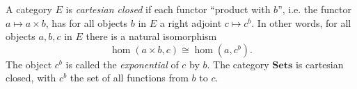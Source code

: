 A category $E$ is \emph{cartesian closed} if each functor ``product with $b$'', i.e. the functor $a \mapsto a \times b$, has for all objects $b$ in $E$ a right adjoint $c \mapsto c^b$. In other words, for all objects $a, b, c$ in $E$ there is a natural isomorphism
$$
\hom(a \times b, c) \cong \hom(a, c^b).
$$
The object $c^b$ is called the \emph{exponential} of $c$ by $b$. The category $\mathbf{Sets}$ is cartesian closed, with $c^b$ the set of all functions from $b$ to $c$.
